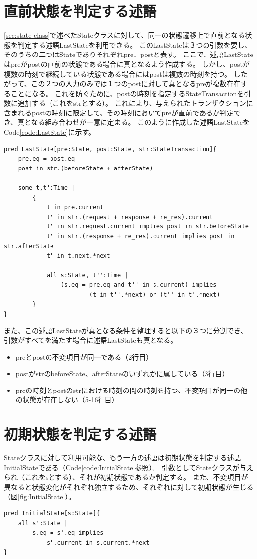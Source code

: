 \documentclass[12pt,a4paper]{jbook}
\begin{document}
\section{直前状態を判定する述語}
\ref{sec:state-class}で述べたStateクラスに対して、同一の状態遷移上で直前となる状態を判定する述語LastStateを利用できる。
このLastStateは３つの引数を要し、そのうちの二つはStateでありそれぞれpre、postと表す。
ここで、述語LastStateはpreがpostの直前の状態である場合に真となるよう作成する。
しかし、postが複数の時刻で継続している状態である場合にはpostは複数の時刻を持つ。
したがって、この２つの入力のみでは１つのpostに対して真となるpreが複数存在することになる。
これを防ぐために、postの時刻を指定するStateTransactionを引数に追加する（これをstrとする）。
これにより、与えられたトランザクションに含まれるpostの時刻に限定して、その時刻においてpreが直前であるか判定でき、真となる組み合わせが一意に定まる。
このように作成した述語LastStateをCode\ref{code:LastState}に示す。

\begin{lstlisting}[caption=状態遷移において直前の状態を判定する述語, label=code:LastState]
pred LastState[pre:State, post:State, str:StateTransaction]{
	pre.eq = post.eq
	post in str.(beforeState + afterState)

	some t,t':Time |
		{
			t in pre.current
			t' in str.(request + response + re_res).current
			t' in str.request.current implies post in str.beforeState
			t' in str.(response + re_res).current implies post in str.afterState
			t' in t.next.*next

			all s:State, t'':Time |
				(s.eq = pre.eq and t'' in s.current) implies
						(t in t''.*next) or (t'' in t'.*next)
		}
}
\end{lstlisting}

また、この述語LastStateが真となる条件を整理すると以下の３つに分割でき、引数がすべてを満たす場合に述語LastStateも真となる。
\begin{itemize}
\item preとpostの不変項目が同一である（2行目）
\item postがstrのbeforeState、afterStateのいずれかに属している（3行目）
\item preの時刻とpostのstrにおける時刻の間の時刻を持つ、不変項目が同一の他の状態が存在しない（5-16行目）
\end{itemize}

\section{初期状態を判定する述語}
Stateクラスに対して利用可能な、もう一方の述語は初期状態を判定する述語InitialStateである（Code\ref{code:InitialState}参照）。
引数としてStateクラスが与えられ（これをsとする）、それが初期状態であるか判定する。
また、不変項目が異なると状態変化がそれぞれ独立するため、それぞれに対して初期状態が生じる（図\ref{fig:InitialState}）。
\begin{lstlisting}[caption=状態遷移において初期状態を判定する述語, label=code:InitialState]
pred InitialState[s:State]{
	all s':State |
		s.eq = s'.eq implies
			s'.current in s.current.*next
}
\end{lstlisting}
\end{document}
